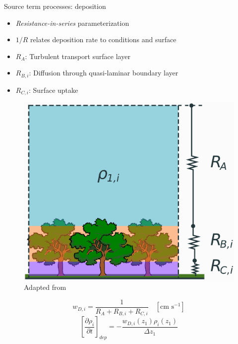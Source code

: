 \documentclass[10pt]{beamer}
\begin{document}
\begin{frame}[fragile]{Source term processes: deposition}
        \begin{minipage}[c]{0.49\textwidth}
        \small
        \begin{itemize}
            \item \textit{Resistance-in-series} parameterization
            \vspace{0.3cm}
            \item $1/R$ relates deposition rate to conditions and surface
            \vspace{0.3cm}
            \item $R_A$: Turbulent transport surface layer
            \vspace{0.3cm}
            \item $R_{B,i}$: Diffusion through quasi-laminar boundary layer
            \vspace{0.3cm}
            \item $R_{C,i}$: Surface uptake
        \end{itemize}
    \end{minipage} \hfill
    \begin{minipage}[c]{0.5\textwidth}
    \begin{figure}
        \centering
        \includegraphics[width=\textwidth]{box-model-dep.eps}    
        \captionsetup{labelformat=empty}
        \caption{Adapted from \cite{brasseur_modeling_2017}}
    \end{figure}
    $$
        w_{D,i} = \frac{1}{R_A + R_{B,i} + R_{C,i}} \quad [\text{cm s}^{-1}]
    $$ 
    \vspace{0.1cm}
    $$
        \left[ \frac{\partial \rho_i}{\partial t} \right]_{dep} = - \frac{w_{D,i}(z_1) \rho_i(z_1)}{\Delta z_1} 
    $$
    \end{minipage}
\end{frame}
\end{document}
